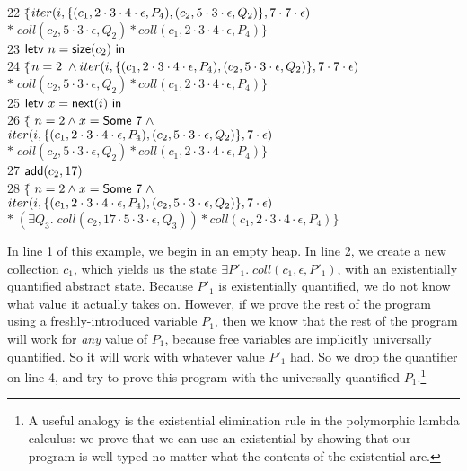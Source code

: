 \documentclass[preprint,natbib]{sigplanconf}
\begin{document}
{\begin{tabbing}
22 \> $\{$\=$iter(i, \{{(c_1, 2\cdot3\cdot4\cdot\epsilon, P_4), (c_2, 5\cdot3\cdot\epsilon, Q_2)}\}, 7\cdot7\cdot\epsilon)$ \\
\> \> $*\; coll(c_2, 5\cdot3\cdot\epsilon, Q_2) * coll(c_1, 2\cdot3\cdot4\cdot\epsilon, P_4)\}$ \\
23 \> $\mbox{\textsf{{letv }}}n = \mbox{\textsf{{size}}}(c_2)\mbox{\textsf{{ in }}}$ \\
24 \> $\{$\=$n = 2 \;\land
iter(i, \{{(c_1, 2\cdot3\cdot4\cdot\epsilon, P_4), (c_2, 5\cdot3\cdot\epsilon, Q_2)}\}, 7\cdot7\cdot\epsilon)$\\
\>\>$*\;coll(c_2, 5\cdot3\cdot\epsilon, Q_2) * coll(c_1, 2\cdot3\cdot4\cdot\epsilon, P_4)\}$ \\

25 \> $\mbox{\textsf{{letv }}}x = \mbox{\textsf{{next}}}(i)\mbox{\textsf{{ in }}}$ \\
26 \> $\{$\= $n = 2 \land x = \mbox{\textsf{{Some }}}7 \;\land $\\
\> \> $iter(i, \{{(c_1, 2\cdot3\cdot4\cdot\epsilon, P_4), (c_2, 5\cdot3\cdot\epsilon, Q_2)}\}, 7\cdot\epsilon)$ \\
\> \> $*\; coll(c_2, 5\cdot3\cdot\epsilon, Q_2) * coll(c_1, 2\cdot3\cdot4\cdot\epsilon, P_4)\}$ \\
27 \> $\mbox{\textsf{{add}}}(c_2, 17)$ \\
28 \> $\{$\= $n = 2 \land x = \mbox{\textsf{{Some }}}7 \;\land $\\
\> \> $iter(i, \{{(c_1, 2\cdot3\cdot4\cdot\epsilon, P_4), (c_2, 5\cdot3\cdot\epsilon, Q_2)}\}, 7\cdot\epsilon)$ \\ 
\> \> $* \; (\exists Q_3.\; coll(c_2, 17\cdot5\cdot3\cdot\epsilon, Q_3)) * coll(c_1, 2\cdot3\cdot4\cdot\epsilon, P_4)\}$ \\
\end{tabbing}
}
In line 1 of this example, we begin in an empty heap. In line 2, we
create a new collection $c_1$, which yields us the state $\exists
P'_1.\; coll(c_1, \epsilon, P'_1)$, with an existentially quantified
abstract state.
%
Because $P'_1$ is existentially quantified, we do not know what value
it actually takes on. However, if we prove the rest of the program
using a freshly-introduced variable $P_1$, then we know that the rest
of the program will work for \emph{any} value of $P_1$, because free
variables are implicitly universally quantified.  So it will work with
whatever value $P'_1$ had. So we drop the quantifier on line 4, and
try to prove this program with the universally-quantified
$P_1$.\footnote{A useful analogy is the existential elimination rule
  in the polymorphic lambda calculus: we prove that we can use an
  existential by showing that our program is well-typed no matter what
  the contents of the existential are.}
\end{document}
